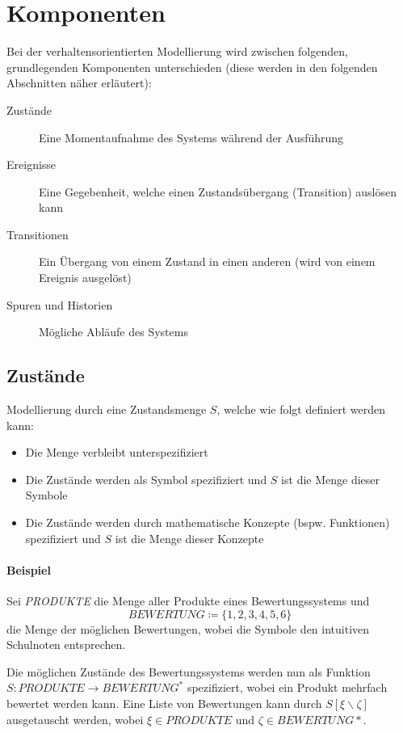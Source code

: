 	\section{Komponenten}
		Bei der verhaltensorientierten Modellierung wird zwischen folgenden, grundlegenden Komponenten unterschieden (diese werden in den folgenden Abschnitten näher erläutert):
		\begin{description}
			\item[Zustände] Eine Momentaufnahme des Systems während der Ausführung
			\item[Ereignisse] Eine Gegebenheit, welche einen Zustandsübergang (Transition) auslösen kann
			\item[Transitionen] Ein Übergang von einem Zustand in einen anderen (wird von einem Ereignis ausgelöst)
			\item[Spuren und Historien] Mögliche Abläufe des Systems
		\end{description}

		\subsection{Zustände}
			Modellierung durch eine Zustandsmenge $ S $, welche wie folgt definiert werden kann:
			\begin{itemize}
				\item Die Menge verbleibt unterspezifiziert
				\item Die Zustände werden als Symbol spezifiziert und $ S $ ist die Menge dieser Symbole
				\item Die Zustände werden durch mathematische Konzepte (bspw. Funktionen) spezifiziert und $ S $ ist die Menge dieser Konzepte
			\end{itemize}

			\paragraph{Beispiel}
				Sei \textit{PRODUKTE} die Menge aller Produkte eines Bewertungssystems und \[ \textit{BEWERTUNG} \coloneqq \{ 1, 2, 3, 4, 5, 6 \} \] die Menge der möglichen Bewertungen, wobei die Symbole den intuitiven Schulnoten entsprechen.

				Die möglichen Zustände des Bewertungssystems werden nun als Funktion $ S : \textit{PRODUKTE} \rightarrow \textit{BEWERTUNG} ^ * $ spezifiziert, wobei ein Produkt mehrfach bewertet werden kann. Eine Liste von Bewertungen kann durch $ S[\xi \backslash \zeta] $ ausgetauscht werden, wobei $ \xi \in \textit{PRODUKTE} $ und $ \zeta \in \textit{BEWERTUNG}* $.

